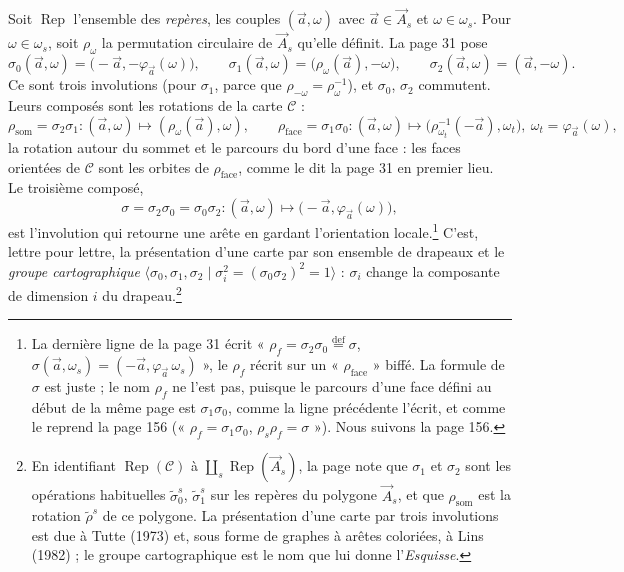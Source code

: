 \documentclass[11pt,a4paper]{article}
\begin{document}
Soit $\operatorname{Rep}$ l'ensemble des \emph{repères}, les couples
$(\vec{a}, \omega)$ avec $\vec{a} \in \vec{A}_s$ et $\omega \in \omega_s$. Pour
$\omega \in \omega_s$, soit $\rho_{\omega}$ la permutation circulaire de
$\vec{A}_s$ qu'elle définit. La page 31 pose
\[
\sigma_0(\vec{a}, \omega) = \bigl(-\vec{a}, -\varphi_{\vec{a}}(\omega)\bigr),
\qquad
\sigma_1(\vec{a}, \omega) = \bigl(\rho_{\omega}(\vec{a}), -\omega\bigr),
\qquad
\sigma_2(\vec{a}, \omega) = (\vec{a}, -\omega).
\]
Ce sont trois involutions (pour $\sigma_1$, parce que $\rho_{-\omega} =
\rho_{\omega}^{-1}$), et $\sigma_0$, $\sigma_2$ commutent. Leurs composés sont
les rotations de la carte $\mathcal{C}$ :
\[
\rho_{\mathrm{som}} = \sigma_2\sigma_1 : (\vec{a}, \omega) \longmapsto
(\rho_{\omega}(\vec{a}), \omega), \qquad
\rho_{\mathrm{face}} = \sigma_1\sigma_0 : (\vec{a}, \omega) \longmapsto \bigl(
\rho_{\omega_t}^{-1}(-\vec{a}), \omega_t \bigr), \ \omega_t =
\varphi_{\vec{a}}(\omega),
\]
la rotation autour du sommet et le parcours du bord d'une face : les faces
orientées de $\mathcal{C}$ sont les orbites de $\rho_{\mathrm{face}}$, comme le
dit la page 31 en premier lieu. Le troisième composé,
\[
\sigma = \sigma_2\sigma_0 = \sigma_0\sigma_2 : (\vec{a}, \omega) \longmapsto
\bigl(-\vec{a}, \varphi_{\vec{a}}(\omega)\bigr),
\]
est l'involution qui retourne une arête en gardant l'orientation
locale.\footnote{La dernière ligne de la page 31 écrit « $\rho_f = \sigma_2\sigma_0
\overset{\mathrm{def}}{=} \sigma$, $\sigma(\vec{a}, \omega_s) = (-\vec{a},
\varphi_{\vec{a}}\,\omega_s)$ », le $\rho_f$ récrit sur un « $\rho_{\mathrm{face}}$ »
biffé. La formule de $\sigma$ est juste ; le nom $\rho_f$ ne l'est pas, puisque
le parcours d'une face défini au début de la même page est
$\sigma_1\sigma_0$, comme la ligne précédente l'écrit, et comme le reprend la
page 156 (« $\rho_f = \sigma_1\sigma_0$, $\rho_s\rho_f = \sigma$ »). Nous
suivons la page 156.} C'est, lettre pour lettre, la présentation d'une carte par
son ensemble de drapeaux et le \emph{groupe cartographique} $\langle \sigma_0,
\sigma_1, \sigma_2 \mid \sigma_i^2 = (\sigma_0\sigma_2)^2 = 1 \rangle$ : $\sigma_i$
change la composante de dimension $i$ du drapeau.\footnote{En identifiant
$\operatorname{Rep}(\mathcal{C})$ à $\coprod_s \operatorname{Rep}(\vec{A}_s)$, la
page note que $\sigma_1$ et $\sigma_2$ sont les opérations habituelles
$\widetilde{\sigma}_0^{s}$, $\widetilde{\sigma}_1^{s}$ sur les repères du polygone
$\vec{A}_s$, et que $\rho_{\mathrm{som}}$ est la rotation $\widetilde{\rho}^{s}$
de ce polygone. La présentation d'une carte par trois involutions est due à
Tutte (1973) et, sous forme de graphes à arêtes coloriées, à Lins (1982) ; le
groupe cartographique est le nom que lui donne l'\emph{Esquisse}.}
\end{document}
